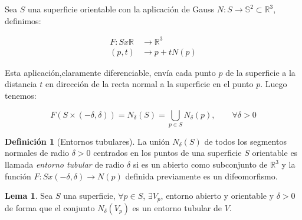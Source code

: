 \documentclass[paper=a4, fontsize=11pt, spanish]{scrartcl}
\newcommand{\rtres}{\mathbb{R}^3}
\theoremstyle{definition}
\newtheorem{lemma}[theorem]{Lema}
\theoremstyle{definition}
\newtheorem{definition}{Definición}
\theoremstyle{definition}
\begin{document}
Sea $S$ una superficie orientable con la aplicación de Gauss $N: S \longrightarrow \mathbb{S}^2 \subset \rtres$, definimos:

\begin{align*}
    F: S x \mathbb{R} &\longrightarrow \rtres \\
    (p,t) &\longrightarrow p + tN(p)
\end{align*}

Esta aplicación,claramente diferenciable, envía cada punto $p$ de la superficie a la distancia $t$ en dirección de la recta normal a la superficie en el punto $p$. Luego tenemos:

\begin{equation*}
    F(S \times (-\delta, \delta)) = N_\delta(S)=\bigcup_{p\in S} N_\delta(p), \qquad \forall \delta > 0
\end{equation*}

\begin{definition}[Entornos tubulares]
La unión $N_\delta(S)$ de todos los segmentos normales de radio $\delta > 0$ centrados en los puntos de una superficie $S$ orientable es llamada \textit{entorno tubular} de radio $\delta$ si es un abierto como subconjunto de $\rtres$ y la función $F: S x (-\delta, \delta) \longrightarrow N(p)$ definida previamente es un difeomorfismo.
\end{definition}

\begin{lemma}
Sea $S$ una superficie, $\forall p \in S$, $\exists V_p$, entorno abierto y orientable y $\delta > 0$ de forma que el conjunto $N_\delta(V_p)$ es un entorno tubular de $V$.
\end{lemma}
\end{document}
